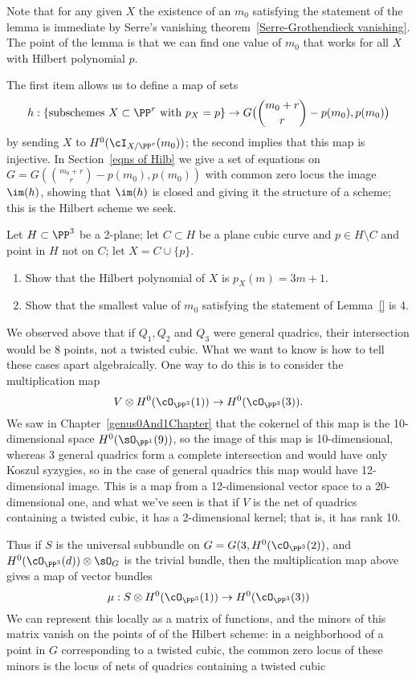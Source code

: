 Note that  for any given $X$ the existence of an $m_0$ satisfying the statement of the lemma is immediate by Serre's vanishing theorem~\ref{Serre-Grothendieck vanishing}. The point of the lemma is that we can find one value of $m_0$ that works for all $X$ with Hilbert polynomial $p$.

The first item allows us to define a  map of sets
$$
h : \left\{ \text{subschemes $X \subset \PP^r$ with $p_X=p$} \right\}  \to G\big(\binom{m_0+r}{r} - p(m_0), p(m_0)\big)
$$
by sending $X$ to $H^0(\cI_{X/\PP^r}(m_0))$; the second implies that this map is injective.  In Section~\ref{eqns of Hilb} we give a set of equations on $G = G(\binom{m_0+r}{r} - p(m_0), p(m_0))$ with common zero locus the image $\im(h)$, showing that $\im(h)$ is closed and giving it the structure of a scheme; this is the Hilbert scheme we seek.

\begin{exercise}
Let $H \subset \PP^3$ be a 2-plane; let $C \subset H$ be a plane cubic curve and $p \in H \setminus C$ and point in $H$ not on $C$; let $X = C \cup \{p\}$.
\begin{enumerate}
\item Show that the Hilbert polynomial of $X$ is $p_X(m) = 3m+1$.
\item Show that the smallest value of $m_0$ satisfying the statement of Lemma~\ref{} is 4.
\end{enumerate}
\end{exercise}

We observed above that if $Q_1, Q_2$ and $Q_3$ were general quadrics, their intersection would be
8 points,  not a twisted cubic. What we want to know is how to tell these cases apart algebraically. One way to do this is to consider the multiplication map
$$
V \otimes H^0(\cO_{\PP^3}(1)) \to H^0(\cO_{\PP^3}(3)).
$$
We saw in Chapter~\ref{genus0And1Chapter} that the cokernel of this map is the 10-dimensional space $H^0(\sO_{\PP^1}(9))$, so the image of this map is 10-dimensional, whereas
3 general quadrics form a complete intersection and would have only Koszul syzygies, so
in the case of general quadrics this map would have 12-dimensional image.
This is a map from a 12-dimensional vector space to a 20-dimensional one, and what we've seen is that if $V$ is the net of quadrics containing a twisted cubic, it has a 2-dimensional kernel; that is, it has rank 10. 

Thus if $S$ is the universal subbundle on $G = G(3, H^0(\cO_{\PP^3}(2))$, and  $H^0(\cO_{\PP^3}(d))\otimes \sO_G$ is the trivial bundle, then the multiplication map above gives a map of vector bundles
$$
\mu: S \otimes H^0(\cO_{\PP^3}(1)) \to H^0(\cO_{\PP^3}(3))
$$
We can represent this locally as a matrix of functions, and the minors of this matrix vanish on the points of
of the Hilbert scheme: in a neighborhood of a point in $G$ corresponding to a twisted cubic, the common zero locus of these minors is the locus of nets of quadrics containing a twisted cubic

